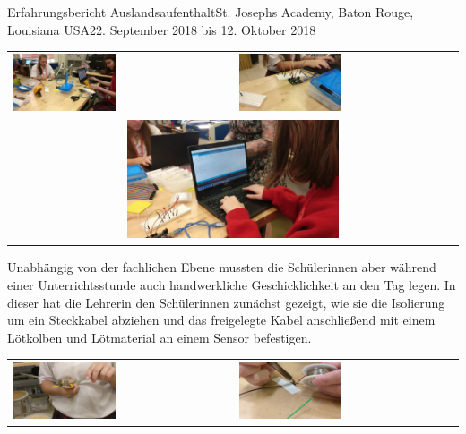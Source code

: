 \documentclass[oneside,openany,headings=optiontotoc,11pt,numbers=noenddot]{article}
\begin{document}
\begin{worksheet}{Erfahrungsbericht Auslandsaufenthalt}{St. Joseph\grq{}s Academy, Baton Rouge, Louisiana USA}{22. September 2018 bis 12. Oktober 2018}
\begin{center}
			\begin{tabularx}{\textwidth}{XX}
				\includegraphics[width=0.48\textwidth]{../99_Bilder/00_arduino.jpg} & \includegraphics[width=0.48\textwidth]{../99_Bilder/01_arduino.jpg}\\
				\multicolumn{2}{c}{\includegraphics[width=0.48\textwidth]{../99_Bilder/02_arduino.jpg}}
			\end{tabularx}
		\end{center}
		Unabhängig von der fachlichen Ebene mussten die Schülerinnen aber während einer Unterrichtsstunde auch handwerkliche Geschicklichkeit an den Tag legen. In dieser hat die Lehrerin den Schülerinnen zunächst gezeigt, wie sie die Isolierung um ein Steckkabel abziehen und das freigelegte Kabel anschließend mit einem Lötkolben und Lötmaterial an einem Sensor befestigen.\\
		\begin{center}
			\begin{tabularx}{\textwidth}{XX}
				\includegraphics[width=0.48\textwidth]{../99_Bilder/00_solder.jpg} & \includegraphics[width=0.48\textwidth]{../99_Bilder/01_solder.jpg}

\end{tabularx}
\end{center}
\end{worksheet}
\end{document}
